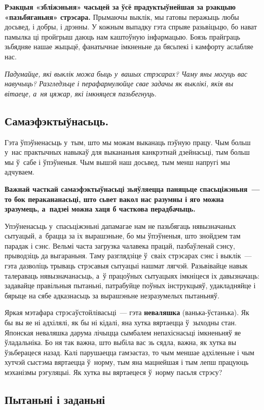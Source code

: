 \textbf{Рэакцыя «збліжэньня» часьцей за ўсё прадуктыўнейшая за рэакцыю «пазьбяганьня» стрэсара.} Прымаючы выклік, мы гатовы перажыць любы досьвед, і добры, і дрэнны. У кожным выпадку гэта спрыяе разьвіцьцю, бо нават памылка ці пройгрыш даюць нам каштоўную інфармацыю. Боязь прайграць зьбядняе нашае жыцьцё, фанатычнае імкненьне да бясьпекі і камфорту аслабляе нас.

\emph{Падумайце, які выклік можа быць у~вашых стрэсарах? Чаму яны могуць вас навучыць? Разгледзьце і перафармулюйце свае задачы як выклікі, якія вы вітаеце, а~ня цяжар, які імкняцеся пазьбегнуць.}

\subsection*{Самаэфэктыўнасьць.}

Гэта ўпэўненасьць у~тым, што мы можам выканаць пэўную працу. Чым больш у~нас практычных навыкаў для выкананьня канкрэтнай дзейнасьці, тым больш мы ў~сабе і ўпэўненыя. Чым вышэй наш досьвед, тым менш напругі мы адчуваем. 

\textbf{Важнай часткай самаэфэктыўнасьці зьяўляецца паняцьце спасьціжэньня~--- то бок перакананасьці, што сьвет вакол нас разумны і яго можна зразумець, а~падзеі можна хаця б часткова перадбачыць.}

Упэўненасьць у~спасьціжэньні дапамагае нам не пазьбягаць нявызначаных сытуацый, а~брацца за іх вырашэньне, бо мы ўпэўненыя, што знойдзем там парадак і сэнс. Вельмі часта загрузка чалавека працай, пазбаўленай сэнсу, прыводзіць да выгараньня. Таму разглядзіце ў~сваіх стрэсарах сэнс і выклік~--- гэта дазволіць трываць стрэсавыя сытуацыі нашмат лягчэй. Разьвівайце навык талераваць нявызначанасьць, а~ў працоўных сытуацыях імкніцеся іх давызначаць: задавайце правільныя пытаньні, патрабуйце поўных інструкцыяў, удакладняйце і бярыце на сябе адказнасьць за вырашэньне незразумелых пытаньняў.

Яркая мэтафара стрэсаўстойлівасьці~--- гэта \textbf{неваляшка} (ванька-ўстанька). Як бы вы яе ні адхілялі, як бы ні кідалі, яна хутка вяртаецца ў~зыходны стан. Японская неваляшка дарума лічыцца сымбалем непахіснасьці імкненьняў яе ўладальніка. Бо ня так важна, што выбіла вас зь сядла, важна, як хутка вы ўзьберацеся назад. Калі парушаецца гамэастаз, то чым меншае адхіленьне і чым хутчэй сыстэма вяртаецца ў~норму, тым яна мацнейшая і тым лепш працуюць мэханізмы рэгуляцыі. Як хутка вы вяртаецеся ў~норму пасьля стрэсу?

\subsection*{Пытаньні і заданьні}

